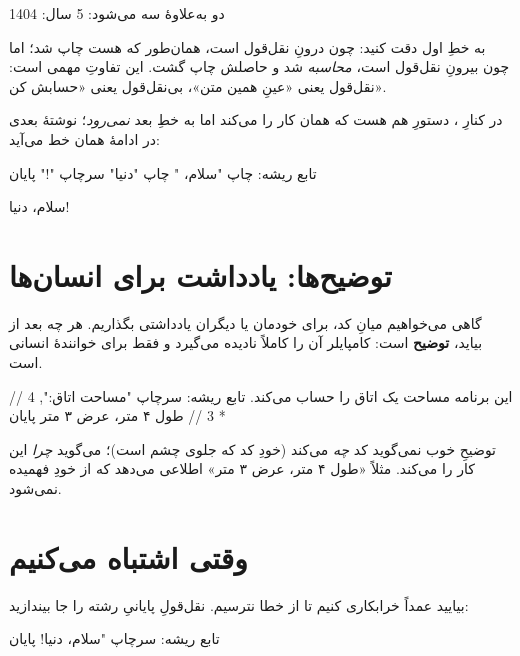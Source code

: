 \begin{progoutfa}
دو به‌علاوهٔ سه می‌شود: 5
سال: 1404
\end{progoutfa}

به خطِ اول دقت کنید:  چون درونِ نقل‌قول
است، همان‌طور که هست چاپ شد؛ اما  چون بیرونِ نقل‌قول است،
\emph{محاسبه} شد و حاصلش چاپ گشت. این تفاوتِ مهمی است: نقل‌قول یعنی «عینِ
همین متن»، بی‌نقل‌قول یعنی «حسابش کن».

در کنارِ ، دستورِ  هم هست که همان کار را می‌کند اما
به خطِ بعد \emph{نمی‌رود}؛ نوشتهٔ بعدی در ادامهٔ همان خط می‌آید:

\begin{salamfa}
تابع ریشه:
    چاپ "سلام، "
    چاپ "دنیا"
    سرچاپ "!"
پایان
\end{salamfa}

\begin{progoutfa}
سلام، دنیا!
\end{progoutfa}

\section{توضیح‌ها: یادداشت برای انسان‌ها}

گاهی می‌خواهیم میانِ کد، برای خودمان یا دیگران یادداشتی بگذاریم. هر چه بعد
از \code{//} بیاید، \textbf{توضیح} است: کامپایلر آن را کاملاً نادیده
می‌گیرد و فقط برای خوانندهٔ انسانی است.

\begin{salamfa}
// این برنامه مساحت یک اتاق را حساب می‌کند.
تابع ریشه:
    سرچاپ "مساحت اتاق:", 4 * 3  // طول ۴ متر، عرض ۳ متر
پایان
\end{salamfa}

\begin{tip}
توضیحِ خوب نمی‌گوید کد \emph{چه} می‌کند (خودِ کد که جلوی چشم است)؛ می‌گوید
\emph{چرا} این کار را می‌کند. مثلاً «طول ۴ متر، عرض ۳ متر» اطلاعی می‌دهد که
از خودِ  فهمیده نمی‌شود.
\end{tip}

\section{وقتی اشتباه می‌کنیم}

بیایید عمداً خرابکاری کنیم تا از خطا نترسیم. نقل‌قولِ پایانیِ رشته را جا
بیندازید:

\begin{salamfa}
تابع ریشه:
    سرچاپ "سلام، دنیا!
پایان
\end{salamfa}

